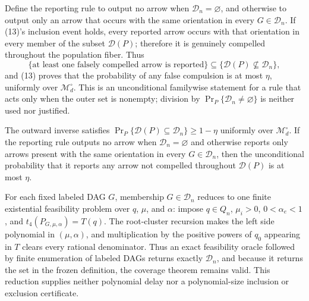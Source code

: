 Define the reporting rule to output no arrow when \(\mathcal D_n=\varnothing\), and otherwise to output only an arrow that occurs with the same orientation in every \(G\in\mathcal D_n\).  If (13)'s inclusion event holds, every reported arrow occurs with that orientation in every member of the subset \(\mathcal D(P)\); therefore it is genuinely compelled throughout the population fiber.  Thus
\[
 \{\text{at least one falsely compelled arrow is reported}\}
 \subseteq
 \{\mathcal D(P)\nsubseteq\mathcal D_n\},
\]
and (13) proves that the probability of any false compulsion is at most \(\eta\), uniformly over \(\mathcal M_d^\circ\).  This is an unconditional familywise statement for a rule that acts only when the outer set is nonempty; division by \(\Pr_P\{\mathcal D_n\ne\varnothing\}\) is neither used nor justified.

The outward inverse satisfies \(\Pr_P\{\mathcal D(P)\subseteq\mathcal D_n\}\ge1-\eta\) uniformly over \(\mathcal M_d^\circ\). If the reporting rule outputs no arrow when \(\mathcal D_n=\varnothing\) and otherwise reports only arrows present with the same orientation in every \(G\in\mathcal D_n\), then the unconditional probability that it reports any arrow not compelled throughout \(\mathcal D(P)\) is at most \(\eta\).

For each fixed labeled DAG \(G\), membership \(G\in\mathcal D_n\) reduces to one finite existential feasibility problem over \(q\), \(\mu\), and \(\alpha\): impose \(q\in Q_n\), \(\mu_i>0\), \(0<\alpha_e<1\), and \(t_4(P_{G,\mu,\alpha})=T(q)\).  The root-cluster recursion makes the left side polynomial in \((\mu,\alpha)\), and multiplication by the positive powers of \(q_0\) appearing in \(T\) clears every rational denominator.  Thus an exact feasibility oracle followed by finite enumeration of labeled DAGs returns exactly \(\mathcal D_n\), and because it returns the set in the frozen definition, the coverage theorem remains valid.  This reduction supplies neither polynomial delay nor a polynomial-size inclusion or exclusion certificate.
